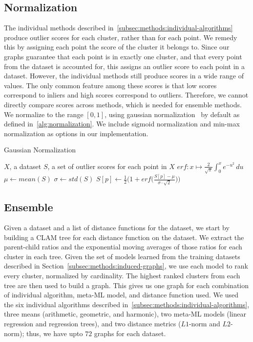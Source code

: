 \subsection{Normalization}
\label{subsec:methods:normalization}

The individual methods described in~\ref{subsec:methods:individual-algorithms} produce outlier scores for each cluster, rather than for each point.
We remedy this by assigning each point the score of the cluster it belongs to.
Since our graphs guarantee that each point is in exactly one cluster, and that every point from the dataset is accounted for, this assigns an outlier score to each point in a dataset.
However, the individual methods still produce scores in a wide range of values.
The only common feature among these scores is that low scores correspond to inliers and high scores correspond to outliers.
Therefore, we cannot directly compare scores across methods, which is needed for ensemble methods.
We normalize to the range $[0, 1]$, using gaussian normalization~\cite{kriegel2011interpreting} by default as defined in~\ref{alg:normalization}.
We include sigmoid normalization and min-max normalization as options in our implementation.

\begin{algorithm}[h]
    \caption{Gaussian Normalization}
    \label{alg:normalization}
\begin{algorithmic}[1]
    \REQUIRE $X$, a dataset
    \REQUIRE $S$, a set of outlier scores for each point in $X$
    \STATE $erf: x \mapsto \frac{2}{\sqrt{\pi}} \int_{0}^{x} e^{-u^2} \,du $
    \STATE $\mu \gets mean(S)$
    \STATE $\sigma \gets std(S)$
        \STATE $S[p] \gets \frac{1}{2} \Big( 1 + erf \big(\frac{S[p] - \mu}{\sigma \cdot \sqrt{2}}\big) \Big) $
    \ENDFOR
\end{algorithmic}
\end{algorithm}

\subsection{Ensemble}
\label{subsec:methods:ensemble}

Given a dataset and a list of distance functions for the dataset, we start by building a CLAM tree for each distance function on the dataset.
We extract the parent-child ratios and the exponential moving averages of those ratios for each cluster in each tree.
Given the set of models learned from the training datasets described in Section~\ref{subsec:methods:induced-graphs}, we use each model to rank every cluster, normalized by cardinality.
The highest ranked clusters from each tree are then used to build a graph.
This gives us one graph for each combination of individual algorithm, meta-ML model, and distance function used.
We used the six individual algorithms described in~\ref{subsec:methods:individual-algorithms}, three means (arithmetic, geometric, and harmonic), two meta-ML models (linear regression and regression trees), and two distance metrics ($L1$-norm and $L2$-norm);
thus, we have upto $72$ graphs for each dataset.

